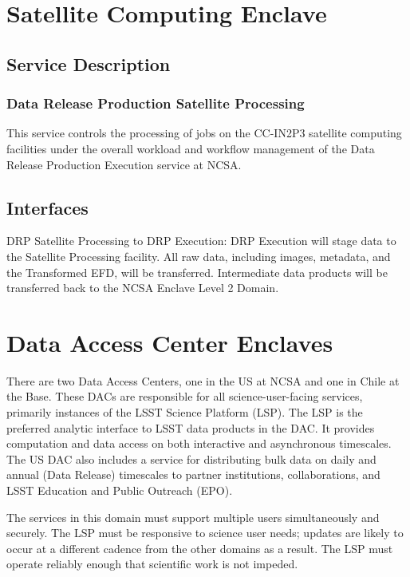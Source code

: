 \documentclass[DM,toc]{lsstdoc}
\begin{document}
\section{Satellite Computing Enclave}\label{satellite-computing-enclave}

\subsection{Service Description}\label{satellite-service-description}

\subsubsection{Data Release Production Satellite
Processing}\label{data-release-production-satellite-processing}

This service controls the processing of jobs on the CC-IN2P3 satellite
computing facilities under the overall workload and workflow management
of the Data Release Production Execution service at NCSA.

\subsection{Interfaces}\label{satellite-interfaces}
DRP Satellite Processing to DRP Execution: DRP Execution will stage data
to the Satellite Processing facility.  All raw data, including images,
metadata, and the Transformed EFD, will be transferred.  Intermediate
data products will be transferred back to the NCSA Enclave Level 2 Domain.


\section{Data Access Center Enclaves}\label{data-access-center-enclaves}

There are two Data Access Centers, one in the US at NCSA and one in
Chile at the Base. These DACs are responsible for all
science-user-facing services, primarily instances of the LSST Science
Platform (LSP). The LSP is the preferred analytic interface to LSST data
products in the DAC. It provides computation and data access on both
interactive and asynchronous timescales. The US DAC also includes a
service for distributing bulk data on daily and annual (Data Release)
timescales to partner institutions, collaborations, and LSST Education
and Public Outreach (EPO).

The services in this domain must support multiple users simultaneously
and securely. The LSP must be responsive to science user needs; updates
are likely to occur at a different cadence from the other domains as a
result. The LSP must operate reliably enough that scientific work is not
impeded.
\end{document}
